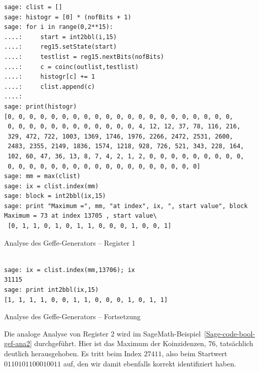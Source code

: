 \begin{refsegment}
\begin{sagecode}
\begin{verbatim}
sage: clist = []
sage: histogr = [0] * (nofBits + 1)
sage: for i in range(0,2**15):
....:     start = int2bbl(i,15)
....:     reg15.setState(start)
....:     testlist = reg15.nextBits(nofBits)
....:     c = coinc(outlist,testlist)
....:     histogr[c] += 1
....:     clist.append(c)
....:
sage: print(histogr)
[0, 0, 0, 0, 0, 0, 0, 0, 0, 0, 0, 0, 0, 0, 0, 0, 0, 0, 0, 0, 0,
 0, 0, 0, 0, 0, 0, 0, 0, 0, 0, 0, 0, 4, 12, 12, 37, 78, 116, 216,
 329, 472, 722, 1003, 1369, 1746, 1976, 2266, 2472, 2531, 2600,
 2483, 2355, 2149, 1836, 1574, 1218, 928, 726, 521, 343, 228, 164,
 102, 60, 47, 36, 13, 8, 7, 4, 2, 1, 2, 0, 0, 0, 0, 0, 0, 0, 0, 0,
 0, 0, 0, 0, 0, 0, 0, 0, 0, 0, 0, 0, 0, 0, 0, 0, 0, 0]
sage: mm = max(clist)
sage: ix = clist.index(mm)
sage: block = int2bbl(ix,15)
sage: print "Maximum =", mm, "at index", ix, ", start value", block
Maximum = 73 at index 13705 , start value\
 [0, 1, 1, 0, 1, 0, 1, 1, 0, 0, 0, 1, 0, 0, 1]
\end{verbatim}
\caption{Analyse des Geffe-Generators -- Register 1}\label{Sage-code-bool-gef-ana1}
\end{sagecode}

\begin{sagecode}
\begin{verbatim}

sage: ix = clist.index(mm,13706); ix
31115
sage: print int2bbl(ix,15)
[1, 1, 1, 1, 0, 0, 1, 1, 0, 0, 0, 1, 0, 1, 1]
\end{verbatim}
\caption{Analyse des Geffe-Generators -- Fortsetzung}\label{Sage-code-bool-gef-ana1a}
\end{sagecode}
\clearpage

Die analoge Analyse von Register 2 wird im SageMath-Beispiel~\ref{Sage-code-bool-gef-ana2}
durchgeführt. Hier ist das Maximum der Koinzidenzen, $76$,
tatsächlich deutlich herausgehoben. Es tritt beim Index $27411$,
also beim Startwert $0110101100010011$ auf, den wir damit
ebenfalls korrekt identifiziert haben.

\begin{sagecode}
\begin{verbatim}


\end{verbatim}
\end{sagecode}
\end{refsegment}
